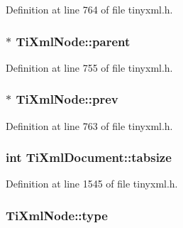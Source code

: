 Definition at line 764 of file tinyxml.h.

\hypertarget{classTiXmlNode_a662c4de61244e4fa5bd4e2d8c63143a5}{
\subsubsection[{parent}]{$\ast$ {\bf TiXmlNode::parent}}}
\label{d3/dd5/classTiXmlNode_a662c4de61244e4fa5bd4e2d8c63143a5}


Definition at line 755 of file tinyxml.h.

\hypertarget{classTiXmlNode_a9c5370ea2cbfd9f0e0f7b30a57fd68f5}{
\subsubsection[{prev}]{$\ast$ {\bf TiXmlNode::prev}}}
\label{d3/dd5/classTiXmlNode_a9c5370ea2cbfd9f0e0f7b30a57fd68f5}


Definition at line 763 of file tinyxml.h.

\hypertarget{classTiXmlDocument_af2fa6a010b903d893d52cc6fee5575a1}{
\subsubsection[{tabsize}]{\setlength{\rightskip}{0pt plus 5cm}int {\bf TiXmlDocument::tabsize}}}
\label{df/d09/classTiXmlDocument_af2fa6a010b903d893d52cc6fee5575a1}


Definition at line 1545 of file tinyxml.h.

\hypertarget{classTiXmlNode_a2619c6379181c16ba95ae6922e2ca839}{
\subsubsection[{type}]{ {\bf TiXmlNode::type}}}
\label{d3/dd5/classTiXmlNode_a2619c6379181c16ba95ae6922e2ca839}


